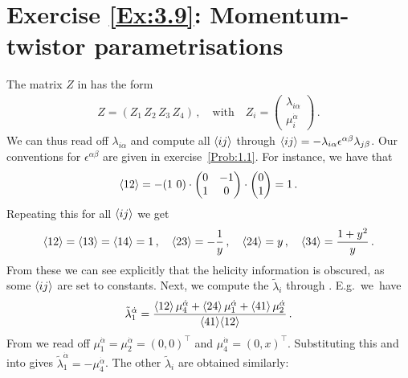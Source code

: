 \section*{Exercise \ref{Ex:3.9}: Momentum-twistor parametrisations}
\label{Sol:3.9}
The matrix $Z$ in  has the form  
\begin{align}
Z = \left( Z_1 \, Z_2 \, Z_3 \, Z_4 \right) \,, \quad \text{with} \quad Z_i = \begin{pmatrix} \lambda_{i\alpha} \\ \mu_i^{\dot{\alpha}} \end{pmatrix}  \,.
\end{align}
We can thus read off $\lambda_{i\alpha}$ and compute all $\langle i j \rangle$ through $\langle i j \rangle = - \lambda_{i \alpha} \epsilon^{\alpha \beta} \lambda_{j \beta}$. Our conventions for $\epsilon^{\alpha \beta}$ are given in exercise~\ref{Prob:1.1}. For instance, we have that
\begin{align}
\langle 1 2 \rangle = - ( 1 \ 0 ) \cdot \begin{pmatrix} 0 & -1 \\ 1 & 0 \\ \end{pmatrix} \cdot \begin{pmatrix} 0 \\ 1 \\ \end{pmatrix} = 1 \,.
\end{align}
Repeating this for all $\langle i j \rangle$ we get
\begin{align} \label{eq:spAs}
\langle 1 2 \rangle = \langle 1 3 \rangle = \langle 1 4 \rangle = 1 \,, \quad \langle 2 3 \rangle = - \frac{1}{y} \,,  \quad  \langle 2 4 \rangle = y \,,  \quad \langle 3 4 \rangle = \frac{1+y^2}{y} \,.
\end{align}
%
From these we can see explicitly that the helicity information is obscured, as some $\langle i j \rangle$ are set to constants.
Next, we compute the $\tilde{\lambda}_i$ through . E.g.\ we~have
\begin{align} \label{eq:lambdat1ex}
\tilde{\lambda}_1^{\dot{\alpha}} = \frac{\langle 1 2 \rangle \, \mu_4^{\dot{\alpha}} + \langle 2 4 \rangle \, \mu_1^{\dot{\alpha}}  + \langle 4 1 \rangle \, \mu_2^{\dot{\alpha}}}{\langle 4 1 \rangle \langle 1 2 \rangle} \,.
\end{align}
From  we read off $\mu_1^{\dot\alpha} = \mu_2^{\dot\alpha} = (0,0)^{\top}$ and $\mu_4^{\dot\alpha} = (0, x)^{\top}$. Substituting this and  into  gives $\tilde{\lambda}_1^{\dot{\alpha}} = -\mu_4^{\dot{\alpha}} $. The other $\tilde{\lambda}_i$ are obtained similarly:
